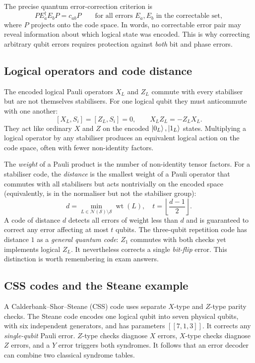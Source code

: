 The precise quantum error-correction criterion is
\begin{equation}\label{eq:knill}
P E_a^\dagger E_b P=c_{ab}P\qquad\text{for all errors $E_a,E_b$ in the correctable set},
\end{equation}
where $P$ projects onto the code space. In words, no correctable error pair may reveal information about which logical state was encoded. This is why correcting arbitrary qubit errors requires protection against \emph{both} bit and phase errors.

\subsection{Logical operators and code distance}
The encoded logical Pauli operators $X_L$ and $Z_L$ commute with every stabiliser but are not themselves stabilisers. For one logical qubit they must anticommute with one another:
\begin{equation}\label{eq:logical}
[X_L,S_i]=[Z_L,S_i]=0,\qquad X_LZ_L=-Z_LX_L.
\end{equation}
They act like ordinary $X$ and $Z$ on the encoded $\left\lvert 0_L\right\rangle,\left\lvert 1_L\right\rangle$ states. Multiplying a logical operator by any stabiliser produces an equivalent logical action on the code space, often with fewer non-identity factors.

The \emph{weight} of a Pauli product is the number of non-identity tensor factors. For a stabiliser code, the \emph{distance} is the smallest weight of a Pauli operator that commutes with all stabilisers but acts nontrivially on the encoded space (equivalently, is in the normaliser but not the stabiliser group):
\begin{equation}\label{eq:distance}
d=\min_{L\in\mathcal N(\mathcal S)\setminus\mathcal S}\operatorname{wt}(L),\quad
t=\left\lfloor\frac{d-1}{2}\right\rfloor.
\end{equation}
A code of distance $d$ detects all errors of weight less than $d$ and is guaranteed to correct any error affecting at most $t$ qubits. The three-qubit repetition code has distance $1$ as a \emph{general quantum code}: $Z_1$ commutes with both checks yet implements logical $Z_L$. It nevertheless corrects a single \emph{bit-flip} error. This distinction is worth remembering in exam answers.

\subsection{CSS codes and the Steane example}
A Calderbank--Shor--Steane (CSS) code uses separate $X$-type and $Z$-type parity checks. The Steane code encodes one logical qubit into seven physical qubits, with six independent generators, and has parameters $[[7,1,3]]$. It corrects any \emph{single-qubit} Pauli error. $Z$-type checks diagnose $X$ errors, $X$-type checks diagnose $Z$ errors, and a $Y$ error triggers both syndromes. It follows that an error decoder can combine two classical syndrome tables.

